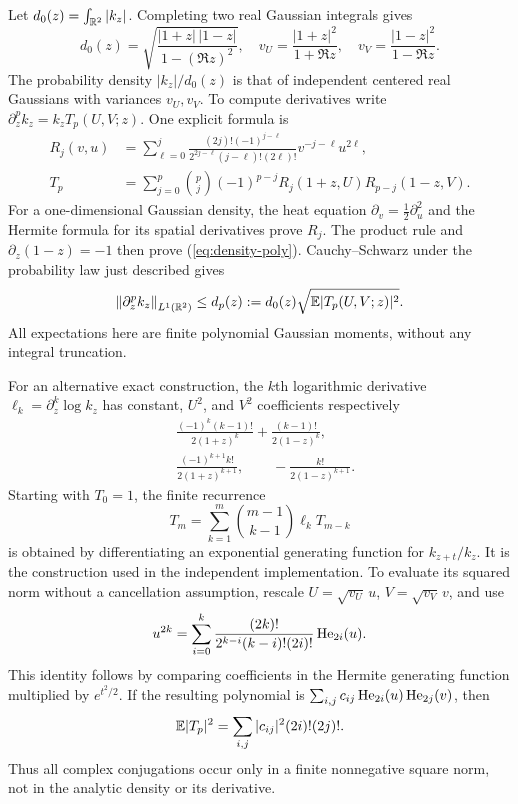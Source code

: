 Let $d_0(z)=\int_{\mathbb R^2}|k_z|$. Completing two real Gaussian integrals
gives
\begin{equation}\label{eq:density-mass}
 d_0(z)=\sqrt{\frac{|1+z|\,|1-z|}{1-(\Re z)^2}},\quad
 v_U=\frac{|1+z|^2}{1+\Re z},\quad
 v_V=\frac{|1-z|^2}{1-\Re z}.
\end{equation}
The probability density $|k_z|/d_0(z)$ is that of independent centered
real Gaussians with variances $v_U,v_V$. To compute derivatives write
$\partial_z^p k_z=k_z T_p(U,V;z)$. One explicit formula is
\begin{align}
 R_j(v,u)&=\sum_{\ell=0}^j
 \frac{(2j)!(-1)^{j-\ell}}{2^{2j-\ell}(j-\ell)!(2\ell)!}
                       v^{-j-\ell}u^{2\ell},\nonumber\\
 T_p&=\sum_{j=0}^p\binom pj(-1)^{p-j}
                          R_j(1+z,U)R_{p-j}(1-z,V).\label{eq:density-poly}
\end{align}
For a one-dimensional Gaussian density, the heat equation
$\partial_v=\tfrac12\partial_u^2$ and the Hermite formula for its
spatial derivatives prove $R_j$. The product rule and
$\partial_z(1-z)=-1$ then prove (\ref{eq:density-poly}).
Cauchy--Schwarz under the probability law just described gives
\begin{equation}\label{eq:density-bound}
 \left\lVert\partial_z^pk_z\right\rVert_{L^1(\mathbb R^2)}
 \leq d_p(z):=d_0(z)\sqrt{\mathbb E|T_p(U,V;z)|^2}.
\end{equation}
All expectations here are finite polynomial Gaussian moments, without
any integral truncation.

For an alternative exact construction, the $k$th logarithmic derivative
$\ell_k=\partial_z^k\log k_z$ has constant, $U^2$, and $V^2$
coefficients respectively
\begin{align*}
 &\frac{(-1)^k(k-1)!}{2(1+z)^k}
           +\frac{(k-1)!}{2(1-z)^k},\\
 &\frac{(-1)^{k+1}k!}{2(1+z)^{k+1}},\qquad
           -\frac{k!}{2(1-z)^{k+1}}.
\end{align*}
Starting with $T_0=1$, the finite recurrence
\[
 T_m=\sum_{k=1}^m\binom{m-1}{k-1}\ell_kT_{m-k}
\]
is obtained by differentiating an exponential generating function for
$k_{z+t}/k_z$. It is the construction used in the independent
implementation. To evaluate its squared norm without a cancellation
assumption, rescale $U=\sqrt{v_U}\,u$, $V=\sqrt{v_V}\,v$, and use
\[
 u^{2k}=\sum_{i=0}^k
 \frac{(2k)!}{2^{k-i}(k-i)!(2i)!}\operatorname{He}_{2i}(u).
\]
This identity follows by comparing coefficients in the Hermite
generating function multiplied by $e^{t^2/2}$. If the resulting
polynomial is $\sum_{i,j}c_{ij}\operatorname{He}_{2i}(u)\operatorname{He}_{2j}(v)$, then
\[
 \mathbb E|T_p|^2=\sum_{i,j}|c_{ij}|^2(2i)!(2j)!.
\]
Thus all complex conjugations occur only in a finite nonnegative square
norm, not in the analytic density or its derivative.


